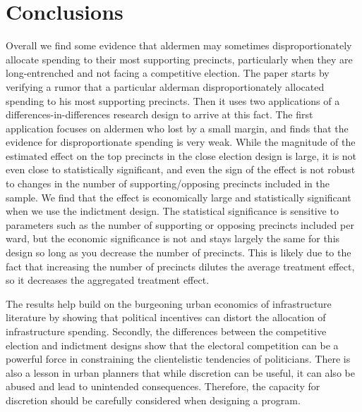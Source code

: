 \section*{Conclusions}\label{sec:conclusions}

Overall we find some evidence that aldermen may sometimes disproportionately allocate spending to their most supporting precincts, particularly when they are long-entrenched and not facing a competitive election.
The paper starts by verifying a rumor that a particular alderman disproportionately allocated spending to his most supporting precincts.
Then it uses two applications of a differences-in-differences research design to arrive at this fact.
The first application focuses on aldermen who lost by a small margin, and finds that the evidence for disproportionate spending is very weak.
While the magnitude of the estimated effect on the top precincts in the close election design is large, it is not even close to statistically significant, and even the sign of the effect is not robust to changes in the number of supporting/opposing precincts included in the sample.
We find that the effect is economically large and statistically significant when we use the indictment design.
The statistical significance is sensitive to parameters such as the number of supporting or opposing precincts included per ward, but the economic significance is not and stays largely the same for this design so long as you decrease the number of precincts.
This is likely due to the fact that increasing the number of precincts dilutes the average treatment effect, so it decreases the aggregated treatment effect.

The results help build on the burgeoning urban economics of infrastructure literature by showing that political incentives can distort the allocation of infrastructure spending.
Secondly, the differences between the competitive election and indictment designs show that the electoral competition can be a powerful force in constraining the clientelistic tendencies of politicians.
There is also a lesson in urban planners that while discretion can be useful, it can also be abused and lead to unintended consequences.
Therefore, the capacity for discretion should be carefully considered when designing a program.
